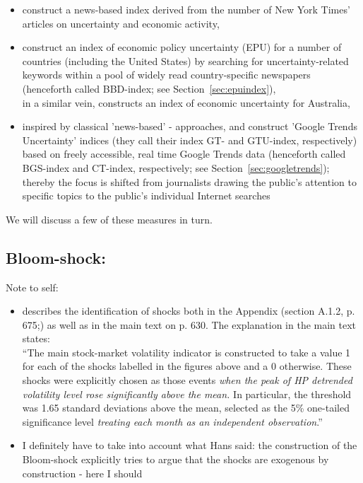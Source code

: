 \documentclass[a4paper,12pt,oneside,pointednumbers,bibtotoc,bigheadings,liststotoc]{scrbook}
\begin{document}
\begin{itemize}
\begin{itemize}
			\begin{itemize}
				\item \citet{alexopoulosandcohen:09} construct a news-based index derived from the number of New York Times' articles on uncertainty and economic activity,
				\item \citet{bakeretal:15} construct an index of economic policy uncertainty (EPU) for a number of countries (including the United States) by searching for uncertainty-related keywords within a pool of widely read country-specific newspapers (henceforth called BBD-index; see Section~\ref{sec:epuindex}),\\
			in a similar vein, \citet{moore:17} constructs an index of economic uncertainty for Australia,
				\item inspired by classical 'news-based' - approaches, \citet{bontempietal:16} and \citet{castelnuovoandtran:17} construct 'Google Trends Uncertainty' indices (they call their index GT- and GTU-index, respectively) based on freely accessible, real time Google Trends data (henceforth called BGS-index and CT-index, respectively; see Section~\ref{sec:googletrends}); thereby the focus is shifted from journalists drawing the public's attention to specific topics to the public's individual Internet searches
			\end{itemize}
		\end{itemize}
\end{itemize} 

We will discuss a few of these measures in turn.


\subsection{Bloom-shock: \citet{bloom:09}}
\label{sec:bloomshock}
\begingroup
    \fontsize{8pt}{12pt}\selectfont
    Note to self:
\begin{itemize}
	\item  \citet{bloom:09} describes the identification of shocks both in the Appendix (section A.1.2, p. 675;) as well as in the main text on p. 630. The explanation in the main text states:\\
``The main stock-market volatility indicator is constructed to take a value 1 for each of the shocks labelled in the figures above and a 0 otherwise. These shocks were explicitly chosen as those events \textit{when the peak of HP detrended volatility level rose significantly above the mean.} In particular, the threshold was 1.65 standard deviations above the mean, selected as the 5\% one-tailed significance level \textit{treating each month as an independent observation}.''
	\item I definitely have to take into account what Hans said: the construction of the Bloom-shock explicitly tries to argue that the shocks are exogenous by construction - here I should 
\end{itemize}
\endgroup
\end{document}
